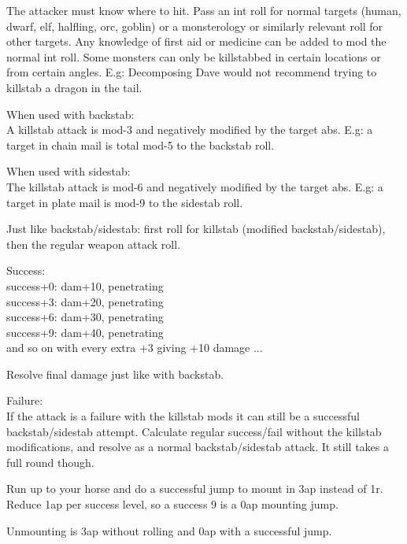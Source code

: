 The attacker must know where to hit. Pass an int roll for normal targets (human, dwarf, elf, halfling, orc, goblin) or a monsterology or similarly relevant roll for other targets. Any knowledge of first aid or medicine can be added to mod the normal int roll. Some monsters can only be killstabbed in certain locations or from certain angles. E.g: Decomposing Dave would not recommend trying to killstab a dragon in the tail.

When used with backstab:\\
A killstab attack is mod-3 and negatively modified by the target abs. E.g: a target in chain mail is total mod-5 to the backstab roll.

When used with sidestab:\\
The killstab attack is mod-6 and negatively modified by the target abs. E.g: a target in plate mail is mod-9 to the sidestab roll.

Just like backstab/sidestab: first roll for killstab (modified backstab/sidestab), then the regular weapon attack roll.

\noindent Success:\\
success+0: dam+10, penetrating\\
success+3: dam+20, penetrating\\
success+6: dam+30, penetrating\\
success+9: dam+40, penetrating\\
and so on with every extra +3 giving +10 damage ...

Resolve final damage just like with backstab.

\noindent Failure:\\
If the attack is a failure with the killstab mods it can still be a successful backstab/sidestab attempt. Calculate regular success/fail without the killstab modifications, and resolve as a normal backstab/sidestab attack. It still takes a full round though.


 Run up to your horse and do a successful jump to mount in 3ap instead of 1r.
Reduce 1ap per success level, so a success 9 is a 0ap mounting jump.

Unmounting is 3ap without rolling and 0ap with a successful jump.


\closeskillslist













